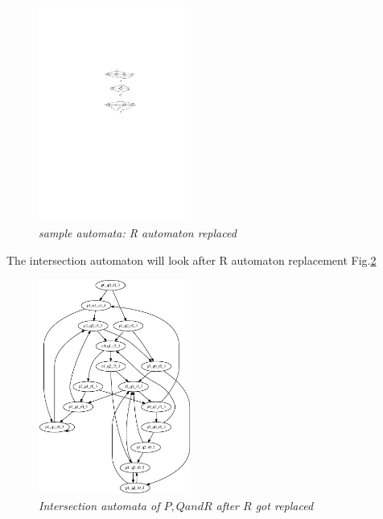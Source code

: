 \begin{figure}
\begin{center}
\includegraphics[width=50mm]{graph_after_r_replacement.pdf}
\end{center}
\caption{{\em sample automata: R automaton replaced}}
\label{automata_r_replaced}
\end{figure}


The intersection automaton will look after R automaton replacement Fig.\ref{graph_r_replaced}

  \begin{figure}
\begin{center}
\includegraphics[width=50mm]{graph_r_replaced.eps}
\end{center}
\caption{{\em Intersection automata of $P, Q and R$ after $R$ got replaced}}
\label{graph_r_replaced}
\end{figure}